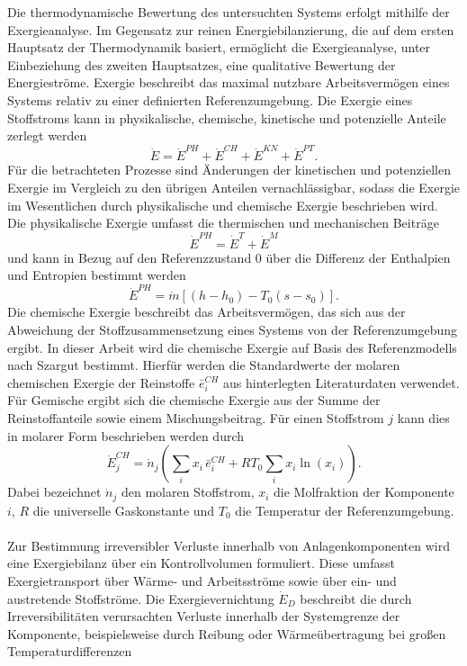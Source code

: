 Die thermodynamische Bewertung des untersuchten Systems erfolgt mithilfe der Exergieanalyse. Im Gegensatz zur reinen Energiebilanzierung, die auf dem ersten Hauptsatz der Thermodynamik basiert, ermöglicht die Exergieanalyse, unter Einbeziehung des zweiten Hauptsatzes, eine qualitative Bewertung der Energieströme. Exergie beschreibt das maximal nutzbare Arbeitsvermögen eines Systems relativ zu einer definierten Referenzumgebung. Die Exergie eines Stoffstroms kann in physikalische, chemische, kinetische und potenzielle Anteile zerlegt werden
\begin{equation}
\dot{E} = \dot{E}^{PH} + \dot{E}^{CH} + \dot{E}^{KN} + \dot{E}^{PT}.
\end{equation}
Für die betrachteten Prozesse sind Änderungen der kinetischen und potenziellen Exergie im Vergleich zu den übrigen Anteilen vernachlässigbar, sodass die Exergie im Wesentlichen durch physikalische und chemische Exergie beschrieben wird. Die physikalische Exergie umfasst die thermischen und mechanischen Beiträge
\begin{equation}
\dot{E}^{PH} = \dot{E}^{T} + \dot{E}^{M}
\end{equation}
und kann in Bezug auf den Referenzzustand 0 über die Differenz der Enthalpien und Entropien bestimmt werden
\begin{equation}
\dot{E}^{PH} = \dot{m} \left[ (h - h_0) - T_0 (s - s_0) \right].
\end{equation}
Die chemische Exergie beschreibt das Arbeitsvermögen, das sich aus der Abweichung der Stoffzusammensetzung eines Systems von der Referenzumgebung ergibt. In dieser Arbeit wird die chemische Exergie auf Basis des Referenzmodells nach Szargut bestimmt. Hierfür werden die Standardwerte der molaren chemischen Exergie der Reinstoffe $\bar{e}^{CH}_i$ aus hinterlegten Literaturdaten verwendet. Für Gemische ergibt sich die chemische Exergie aus der Summe der Reinstoffanteile sowie einem Mischungsbeitrag. Für einen Stoffstrom $j$ kann dies in molarer Form beschrieben werden durch
\begin{equation}
\dot{E}^{CH}_j
=
\dot{n}_j
\left(
\sum_i x_i \,\bar{e}^{CH}_i
+
R T_0 \sum_i x_i \ln(x_i)
\right).
\label{eq:chemExergySzargut}
\end{equation}
Dabei bezeichnet $\dot{n}_j$ den molaren Stoffstrom, $x_i$ die Molfraktion der Komponente $i$, $R$ die universelle Gaskonstante und $T_0$ die Temperatur der Referenzumgebung.\\
\\
Zur Bestimmung irreversibler Verluste innerhalb von Anlagenkomponenten wird eine Exergiebilanz über ein Kontrollvolumen formuliert. Diese umfasst Exergietransport über Wärme- und Arbeitsströme sowie über ein- und austretende Stoffströme. Die Exergievernichtung $\dot{E}_D$ beschreibt die durch Irreversibilitäten verursachten Verluste innerhalb der Systemgrenze der Komponente, beispielsweise durch Reibung oder Wärmeübertragung bei großen Temperaturdifferenzen
